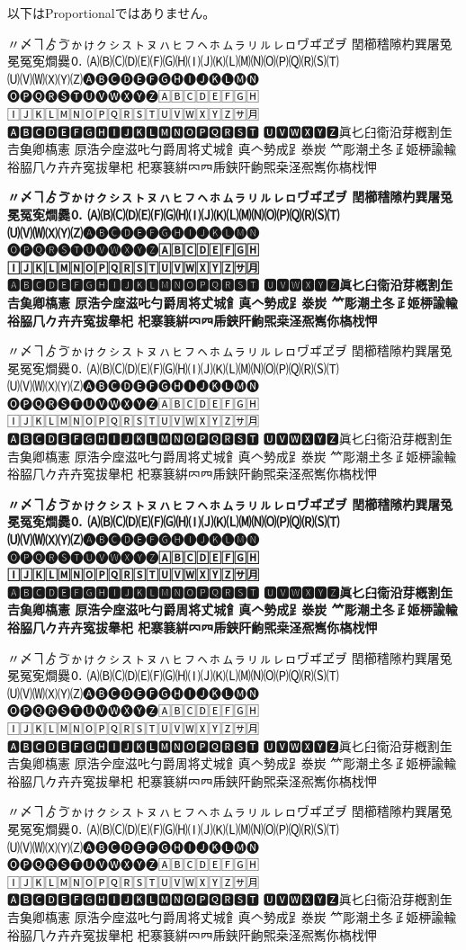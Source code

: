 \documentclass[a4paper,titlepage, draft]{\class}
\begin{document}
\ifuptexmode
以下はProportionalではありません。

{\propshape
\noindent 〃〆ヿゟゔゕゖㇰㇱㇲㇳㇴㇵㇶㇷㇸㇹㇺㇻㇼㇽㇾㇿヷヸヹヺ
𨳝櫛𥡴𨻶杓巽屠兔冕冤𡨚𤏐爨🄀
🄐🄑🄒🄓🄔🄕🄖🄗🄘🄙🄚🄛🄜🄝🄞🄟🄠🄡🄢🄣
🄤🄥🄦🄧🄨🄩🅐🅑🅒🅓🅔🅕🅖🅗🅘🅙🅚🅛🅜🅝
🅞🅟🅠🅡🅢🅣🅤🅥🅦🅧🅨🅩🄰🄱🄲🄳🄴🄵🄶🄷
🄸🄹🄺🄻🄼🄽🄾🄿🅀🅁🅂🅃🅄🅅🅆🅇🅈🅉🈂🈷
🅰🅱🅲🅳🅴🅵🅶🅷🅸🅹🅺🅻🅼🅽🅾🅿🆀🆁🆂🆃
🆄🆅🆆🆇🆈🆉眞𠤎𦥑𫟘沿芽槪割𦈢𠮷𩵋卿𫞎憲
𠩤浩𫝆𫝷滋𠮟勺爵周将𠀋城𩙿真𠆢𫝑成𧾷𣳾炭
𥫗彫潮𡈽冬𤴔姬𫞉諭輸𥙿𦚰𠘨𠂊𠦄卉寃拔𦦙𣏌
杞𪧦𫞽絣𠔿𦉪𠂰𨦇𨸗𫠚𤋮桒𣲾𠘑嶲你𣘺𣏾𢘉

\bfseries
\noindent 〃〆ヿゟゔゕゖㇰㇱㇲㇳㇴㇵㇶㇷㇸㇹㇺㇻㇼㇽㇾㇿヷヸヹヺ
𨳝櫛𥡴𨻶杓巽屠兔冕冤𡨚𤏐爨🄀
🄐🄑🄒🄓🄔🄕🄖🄗🄘🄙🄚🄛🄜🄝🄞🄟🄠🄡🄢🄣
🄤🄥🄦🄧🄨🄩🅐🅑🅒🅓🅔🅕🅖🅗🅘🅙🅚🅛🅜🅝
🅞🅟🅠🅡🅢🅣🅤🅥🅦🅧🅨🅩🄰🄱🄲🄳🄴🄵🄶🄷
🄸🄹🄺🄻🄼🄽🄾🄿🅀🅁🅂🅃🅄🅅🅆🅇🅈🅉🈂🈷
🅰🅱🅲🅳🅴🅵🅶🅷🅸🅹🅺🅻🅼🅽🅾🅿🆀🆁🆂🆃
🆄🆅🆆🆇🆈🆉眞𠤎𦥑𫟘沿芽槪割𦈢𠮷𩵋卿𫞎憲
𠩤浩𫝆𫝷滋𠮟勺爵周将𠀋城𩙿真𠆢𫝑成𧾷𣳾炭
𥫗彫潮𡈽冬𤴔姬𫞉諭輸𥙿𦚰𠘨𠂊𠦄卉寃拔𦦙𣏌
杞𪧦𫞽絣𠔿𦉪𠂰𨦇𨸗𫠚𤋮桒𣲾𠘑嶲你𣘺𣏾𢘉
}

{\gtfamily\mdseries\propshape
\noindent 〃〆ヿゟゔゕゖㇰㇱㇲㇳㇴㇵㇶㇷㇸㇹㇺㇻㇼㇽㇾㇿヷヸヹヺ
𨳝櫛𥡴𨻶杓巽屠兔冕冤𡨚𤏐爨🄀
🄐🄑🄒🄓🄔🄕🄖🄗🄘🄙🄚🄛🄜🄝🄞🄟🄠🄡🄢🄣
🄤🄥🄦🄧🄨🄩🅐🅑🅒🅓🅔🅕🅖🅗🅘🅙🅚🅛🅜🅝
🅞🅟🅠🅡🅢🅣🅤🅥🅦🅧🅨🅩🄰🄱🄲🄳🄴🄵🄶🄷
🄸🄹🄺🄻🄼🄽🄾🄿🅀🅁🅂🅃🅄🅅🅆🅇🅈🅉🈂🈷
🅰🅱🅲🅳🅴🅵🅶🅷🅸🅹🅺🅻🅼🅽🅾🅿🆀🆁🆂🆃
🆄🆅🆆🆇🆈🆉眞𠤎𦥑𫟘沿芽槪割𦈢𠮷𩵋卿𫞎憲
𠩤浩𫝆𫝷滋𠮟勺爵周将𠀋城𩙿真𠆢𫝑成𧾷𣳾炭
𥫗彫潮𡈽冬𤴔姬𫞉諭輸𥙿𦚰𠘨𠂊𠦄卉寃拔𦦙𣏌
杞𪧦𫞽絣𠔿𦉪𠂰𨦇𨸗𫠚𤋮桒𣲾𠘑嶲你𣘺𣏾𢘉

\bfseries\propshape
\noindent 〃〆ヿゟゔゕゖㇰㇱㇲㇳㇴㇵㇶㇷㇸㇹㇺㇻㇼㇽㇾㇿヷヸヹヺ
𨳝櫛𥡴𨻶杓巽屠兔冕冤𡨚𤏐爨🄀
🄐🄑🄒🄓🄔🄕🄖🄗🄘🄙🄚🄛🄜🄝🄞🄟🄠🄡🄢🄣
🄤🄥🄦🄧🄨🄩🅐🅑🅒🅓🅔🅕🅖🅗🅘🅙🅚🅛🅜🅝
🅞🅟🅠🅡🅢🅣🅤🅥🅦🅧🅨🅩🄰🄱🄲🄳🄴🄵🄶🄷
🄸🄹🄺🄻🄼🄽🄾🄿🅀🅁🅂🅃🅄🅅🅆🅇🅈🅉🈂🈷
🅰🅱🅲🅳🅴🅵🅶🅷🅸🅹🅺🅻🅼🅽🅾🅿🆀🆁🆂🆃
🆄🆅🆆🆇🆈🆉眞𠤎𦥑𫟘沿芽槪割𦈢𠮷𩵋卿𫞎憲
𠩤浩𫝆𫝷滋𠮟勺爵周将𠀋城𩙿真𠆢𫝑成𧾷𣳾炭
𥫗彫潮𡈽冬𤴔姬𫞉諭輸𥙿𦚰𠘨𠂊𠦄卉寃拔𦦙𣏌
杞𪧦𫞽絣𠔿𦉪𠂰𨦇𨸗𫠚𤋮桒𣲾𠘑嶲你𣘺𣏾𢘉
}

{\mgfamily\propshape
\noindent 〃〆ヿゟゔゕゖㇰㇱㇲㇳㇴㇵㇶㇷㇸㇹㇺㇻㇼㇽㇾㇿヷヸヹヺ
𨳝櫛𥡴𨻶杓巽屠兔冕冤𡨚𤏐爨🄀
🄐🄑🄒🄓🄔🄕🄖🄗🄘🄙🄚🄛🄜🄝🄞🄟🄠🄡🄢🄣
🄤🄥🄦🄧🄨🄩🅐🅑🅒🅓🅔🅕🅖🅗🅘🅙🅚🅛🅜🅝
🅞🅟🅠🅡🅢🅣🅤🅥🅦🅧🅨🅩🄰🄱🄲🄳🄴🄵🄶🄷
🄸🄹🄺🄻🄼🄽🄾🄿🅀🅁🅂🅃🅄🅅🅆🅇🅈🅉🈂🈷
🅰🅱🅲🅳🅴🅵🅶🅷🅸🅹🅺🅻🅼🅽🅾🅿🆀🆁🆂🆃
🆄🆅🆆🆇🆈🆉眞𠤎𦥑𫟘沿芽槪割𦈢𠮷𩵋卿𫞎憲
𠩤浩𫝆𫝷滋𠮟勺爵周将𠀋城𩙿真𠆢𫝑成𧾷𣳾炭
𥫗彫潮𡈽冬𤴔姬𫞉諭輸𥙿𦚰𠘨𠂊𠦄卉寃拔𦦙𣏌
杞𪧦𫞽絣𠔿𦉪𠂰𨦇𨸗𫠚𤋮桒𣲾𠘑嶲你𣘺𣏾𢘉
}

{\gtfamily\ebseries
\noindent 〃〆ヿゟゔゕゖㇰㇱㇲㇳㇴㇵㇶㇷㇸㇹㇺㇻㇼㇽㇾㇿヷヸヹヺ
𨳝櫛𥡴𨻶杓巽屠兔冕冤𡨚𤏐爨🄀
🄐🄑🄒🄓🄔🄕🄖🄗🄘🄙🄚🄛🄜🄝🄞🄟🄠🄡🄢🄣
🄤🄥🄦🄧🄨🄩🅐🅑🅒🅓🅔🅕🅖🅗🅘🅙🅚🅛🅜🅝
🅞🅟🅠🅡🅢🅣🅤🅥🅦🅧🅨🅩🄰🄱🄲🄳🄴🄵🄶🄷
🄸🄹🄺🄻🄼🄽🄾🄿🅀🅁🅂🅃🅄🅅🅆🅇🅈🅉🈂🈷
🅰🅱🅲🅳🅴🅵🅶🅷🅸🅹🅺🅻🅼🅽🅾🅿🆀🆁🆂🆃
🆄🆅🆆🆇🆈🆉眞𠤎𦥑𫟘沿芽槪割𦈢𠮷𩵋卿𫞎憲
𠩤浩𫝆𫝷滋𠮟勺爵周将𠀋城𩙿真𠆢𫝑成𧾷𣳾炭
𥫗彫潮𡈽冬𤴔姬𫞉諭輸𥙿𦚰𠘨𠂊𠦄卉寃拔𦦙𣏌
杞𪧦𫞽絣𠔿𦉪𠂰𨦇𨸗𫠚𤋮桒𣲾𠘑嶲你𣘺𣏾𢘉
}
\fi
\end{document}
